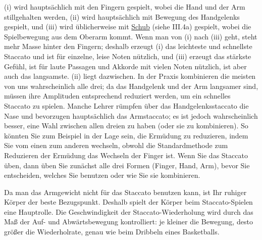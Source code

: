 (i) wird hauptsächlich mit den Fingern gespielt, wobei die Hand und der Arm stillgehalten werden, (ii) wird hauptsächlich mit Bewegung des Handgelenks gespielt, und (iii) wird üblicherweise mit \hyperref[c1iii4SchubZug]{Schub} (siehe III.4a) gespielt, wobei die Spielbewegung aus dem Oberarm kommt.
Wenn man von (i) nach (iii) geht, steht mehr Masse hinter den Fingern; deshalb erzeugt (i) das leichteste und schnellste Staccato und ist für einzelne, leise Noten nützlich, und (iii) erzeugt das stärkste Gefühl, ist für laute Passagen und Akkorde mit vielen Noten nützlich, ist aber auch das langsamste.
(ii) liegt dazwischen.
In der Praxis kombinieren die meisten von uns wahrscheinlich alle drei; da das Handgelenk und der Arm langsamer sind, müssen ihre Amplituden entsprechend reduziert werden, um ein schnelles Staccato zu spielen.
Manche Lehrer rümpfen über das Handgelenksstaccato die Nase und bevorzugen hauptsächlich das Armstaccato; es ist jedoch wahrscheinlich besser, eine Wahl zwischen allen dreien zu haben (oder sie zu kombinieren).
So könnten Sie zum Beispiel in der Lage sein, die Ermüdung zu reduzieren, indem Sie vom einen zum anderen wechseln, obwohl die Standardmethode zum Reduzieren der Ermüdung das Wechseln der Finger ist.
Wenn Sie das Staccato üben, dann üben Sie zunächst alle drei Formen (Finger, Hand, Arm), bevor Sie entscheiden, welches Sie benutzen oder wie Sie sie kombinieren.

Da man das Armgewicht nicht für das Staccato benutzen kann, ist Ihr ruhiger Körper der beste Bezugspunkt.
Deshalb spielt der Körper beim Staccato-Spielen eine Hauptrolle.
Die Geschwindigkeit der Staccato-Wiederholung wird durch das Maß der Auf- und Abwärtsbewegung kontrolliert: je kleiner die Bewegung, desto größer die Wiederholrate, genau wie beim Dribbeln eines Basketballs.
  


